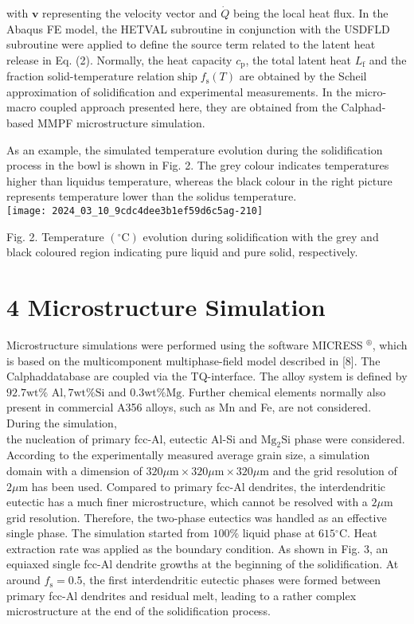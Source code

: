 \documentclass[10pt]{article}
\begin{document}
with $\mathbf{v}$ representing the velocity vector and $\dot{Q}$ being the local heat flux. In the Abaqus FE model, the HETVAL subroutine in conjunction with the USDFLD subroutine were applied to define the source term related to the latent heat release in Eq. (2). Normally, the heat capacity $c_{\mathrm{p}}$, the total latent heat $L_{\mathrm{f}}$ and the fraction solid-temperature relation$\operatorname{ship} f_{\mathrm{s}}(T)$ are obtained by the Scheil approximation of solidification and experimental measurements. In the micro-macro coupled approach presented here, they are obtained from the Calphad-based MMPF microstructure simulation.

As an example, the simulated temperature evolution during the solidification process in the bowl is shown in Fig. 2. The grey colour indicates temperatures higher than liquidus temperature, whereas the black colour in the right picture represents temperature lower than the solidus temperature.\\
\texttt{[image: 2024\_03\_10\_9cdc4dee3b1ef59d6c5ag-210]}

Fig. 2. Temperature $\left({ }^{\circ} \mathrm{C}\right)$ evolution during solidification with the grey and black coloured region indicating pure liquid and pure solid, respectively.

\section*{4 Microstructure Simulation}
Microstructure simulations were performed using the software MICRESS ${ }^{\circledR}$, which is based on the multicomponent multiphase-field model described in [8]. The Calphaddatabase are coupled via the TQ-interface. The alloy system is defined by $92.7 \mathrm{wt} \%$ $\mathrm{Al}, 7 \mathrm{wt} \% \mathrm{Si}$ and $0.3 \mathrm{wt} \% \mathrm{Mg}$. Further chemical elements normally also present in commercial A356 alloys, such as Mn and Fe, are not considered. During the simulation,\\
the nucleation of primary fcc-Al, eutectic Al-Si and $\mathrm{Mg}_{2} \mathrm{Si}$ phase were considered. According to the experimentally measured average grain size, a simulation domain with a dimension of $320 \mu \mathrm{m} \times 320 \mu \mathrm{m} \times 320 \mu \mathrm{m}$ and the grid resolution of $2 \mu \mathrm{m}$ has been used. Compared to primary fcc-Al dendrites, the interdendritic eutectic has a much finer microstructure, which cannot be resolved with a $2 \mu \mathrm{m}$ grid resolution. Therefore, the two-phase eutectics was handled as an effective single phase. The simulation started from $100 \%$ liquid phase at $615{ }^{\circ} \mathrm{C}$. Heat extraction rate was applied as the boundary condition. As shown in Fig. 3, an equiaxed single fcc-Al dendrite growths at the beginning of the solidification. At around $f_{\mathrm{s}}=0.5$, the first interdendritic eutectic phases were formed between primary fcc-Al dendrites and residual melt, leading to a rather complex microstructure at the end of the solidification process.
\end{document}
